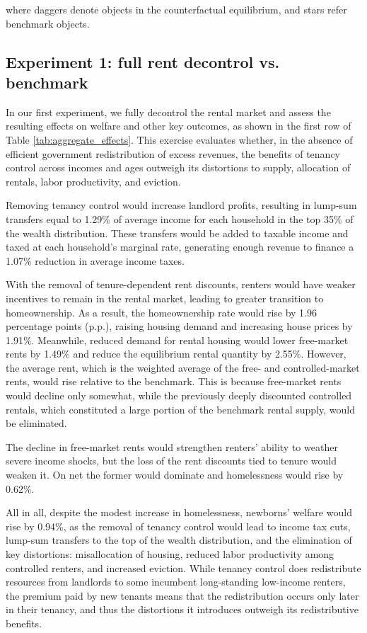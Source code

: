 \documentclass[parskip=full]{article}
\begin{document}
\noindent where daggers denote objects in the counterfactual equilibrium, and stars refer benchmark objects. 

\subsection{Experiment 1: full rent decontrol vs. benchmark}\label{sec:exp_1}

In our first experiment, we fully decontrol the rental market and assess the resulting effects on welfare and other key outcomes, as shown in the first row of Table \ref{tab:aggregate_effects}. This exercise evaluates whether, in the absence of efficient government redistribution of excess revenues, the benefits of tenancy control across incomes and ages outweigh its distortions to supply, allocation of rentals, labor productivity, and eviction.

Removing tenancy control would increase landlord profits, resulting in lump-sum transfers equal to 1.29\% of average income for each household in the top 35\% of the wealth distribution. These transfers would be added to taxable income and taxed at each household’s marginal rate, generating enough revenue to finance a 1.07\% reduction in average income taxes.

With the removal of tenure-dependent rent discounts, renters would have weaker incentives to remain in the rental market, leading to greater transition to homeownership. As a result, the homeownership rate would rise by 1.96 percentage points (p.p.), raising housing demand and increasing house prices by 1.91\%. Meanwhile, reduced demand for rental housing would lower free-market rents by 1.49\% and reduce the equilibrium rental quantity by 2.55\%. However, the average rent, which is the weighted average of the free- and controlled-market rents, would rise relative to the benchmark. This is because free-market rents would decline only somewhat, while the previously deeply discounted controlled rentals, which constituted a large portion of the benchmark rental supply, would be eliminated.

The decline in free-market rents would strengthen renters' ability to weather severe income shocks, but the loss of the rent discounts tied to tenure would weaken it. On net the former would dominate and homelessness would rise by 0.62\%. 

All in all, despite the modest increase in homelessness, newborns' welfare would rise by 0.94\%, as the removal of tenancy control would lead to income tax cuts, lump-sum transfers to the top of the wealth distribution, and the elimination of key distortions: misallocation of housing, reduced labor productivity among controlled renters, and increased eviction. While tenancy control does redistribute resources from landlords to some incumbent long-standing low-income renters, the premium paid by new tenants means that the redistribution occurs only later in their tenancy, and thus the distortions it introduces outweigh its redistributive benefits.
\end{document}
